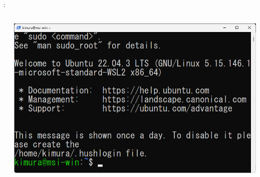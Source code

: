 \documentclass[aspectratio=169,dvipdfmx,cjk]{beamer}
\begin{document}
\begin{frame}{\insertsection \thesubsection: \insertsubsection}
\begin{columns}
\begin{column}{0.33\textwidth}
    \end{column}
    \begin{column}{0.33\textwidth}
      \includegraphics[width=1.0\linewidth]{fig/ubuntu-successful.png}
    \end{column}
  \end{columns}
\end{frame}
\end{document}
